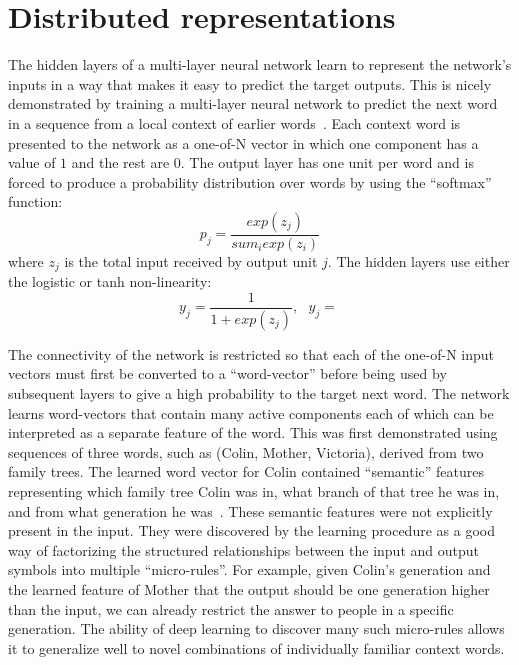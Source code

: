 \documentclass[]{article}
\begin{document}
\section{Distributed representations}

The hidden layers of a multi-layer neural network learn to represent the
network's inputs in a way that makes it easy to predict the target
outputs. This is nicely demonstrated by training a multi-layer neural
network to predict the next word in a sequence from a local context of
earlier words~\citep{BenDucVin01-short}. 
Each context word is presented to the network as a one-of-N
vector in which one component has a value of $1$ and the rest are $0$. The
output layer has one unit per word and is forced to produce a probability
distribution over words by using the ``softmax'' function:
\begin{equation}
p_j = \frac{exp(z_j)}{sum_i exp(z_i)}
\end{equation}
where $z_j$ is the total input received by output unit $j$. The hidden
layers use either the logistic or tanh non-linearity:
\begin{equation}
y_j = \frac{1}{1+ exp(z_j)}, \ \ \ y_j = \frac{}{} %
\end{equation}

The connectivity of the network is restricted so that each of the one-of-N
input vectors must first be converted to a ``word-vector'' before being
used by subsequent layers to give a high probability to the target next
word.  The network learns word-vectors that contain many active components
each of which can be interpreted as a separate feature of the word. This
was first demonstrated\cite{RHW} using sequences of three words, such as
(Colin, Mother, Victoria), derived from two family trees. The learned word
vector for Colin contained ``semantic'' features representing which family
tree Colin was in, what branch of that tree he was in, and from what generation
he was~\cite{hinton86}. These semantic features were not explicitly present
in the input.  They were discovered by the learning procedure as a good way
of factorizing the structured relationships between the input and output
symbols into multiple ``micro-rules''.  For example, given Colin's
generation and the learned feature of Mother that the output should be one
generation higher than the input, we can already restrict the answer to
people in a specific generation. The ability of deep learning to discover
many such micro-rules allows it to generalize well to novel combinations of
individually familiar context words.
\end{document}
